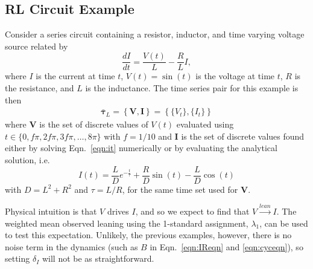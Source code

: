 \documentclass[a4paper,11pt,twocolumn]{article}
\begin{document}
\subsection{RL Circuit Example}
\label{sec:rlcirc}
Consider a series circuit containing a resistor, inductor, and time varying voltage source related by
\begin{equation}
\label{eqn:it}
\frac{dI}{dt} = \frac{V(t)}{L} - \frac{R}{L} I,
\end{equation}
where $I$ is the current at time $t$, $V(t)= \sin\left(t\right)$ is the voltage at time $t$, $R$ is the resistance, and $L$ is the inductance.  The time series pair for this example is then 
\begin{eqnarray}
\label{eqn:RLcirceqn}
\bar{\mathbf{\tau}}_L = \left\{\mathbf{V},\mathbf{I}\right\} = \left\{\{V_t\},\{I_t\}\right\}
\end{eqnarray}
where $\mathbf{V}$ is the set of discrete values of $V(t)$ evaluated using $t\in\{0,f\pi,2f\pi,3f\pi,\ldots,8\pi\}$ with $f=1/10$ and $\mathbf{I}$ is the set of discrete values found either by solving Eqn.\ \ref{eqn:it} numerically or by evaluating the analytical solution, i.e.\
\begin{equation}
I(t) = \frac{L}{D}e^{-\frac{t}{\tau}}+\frac{R}{D}\sin(t)-\frac{L}{D}\cos(t)
\end{equation}
with $D = L^2 + R^2$ and $\tau = L/R$, for the same time set used for $\mathbf{V}$.

Physical intuition is that $V$ drives $I$, and so we expect to find that $V\xrightarrow{lean}I$.  The weighted mean observed leaning using the 1-standard assignment, $\lambda_1$, can be used to test this expectation.  Unlikely, the previous examples, however, there is no noise term in the dynamics (such as $B$ in Eqn.\ \ref{eqn:IReqn} and \ref{eqn:cyceqn}), so setting $\delta_I$ will not be as straightforward.  
\end{document}

